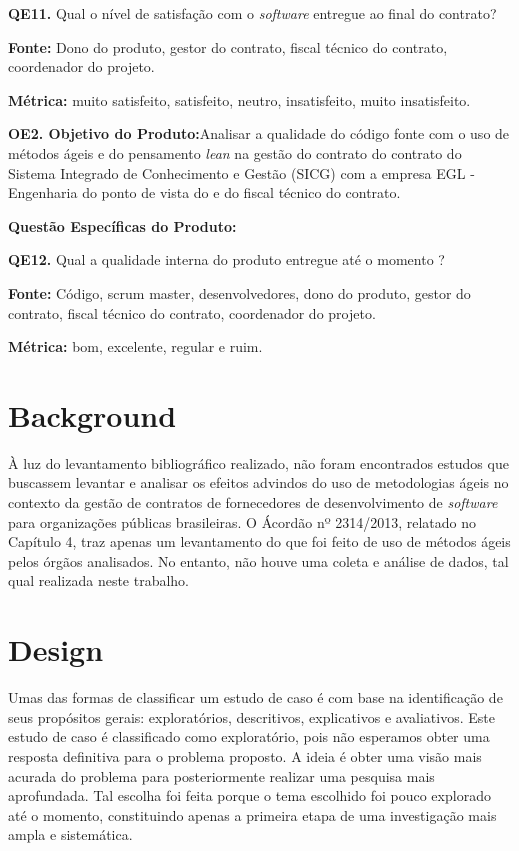  \vspace{\onelineskip} 

\textbf{QE11.} Qual o nível de satisfação com o \textit{software} entregue ao final do contrato?

\textbf{Fonte:} Dono do produto, gestor do contrato, fiscal técnico do contrato, coordenador do projeto.

\textbf{Métrica:} muito satisfeito, satisfeito, neutro, insatisfeito, muito insatisfeito.
 
 \vspace{\onelineskip} 

\textbf{OE2. Objetivo do Produto:}Analisar a qualidade do código fonte com o uso de métodos ágeis e do pensamento \textit{lean} na gestão do contrato do contrato do Sistema Integrado 
de Conhecimento e Gestão (SICG) com a empresa EGL - Engenharia do ponto de vista do  e do fiscal técnico do contrato.

\textbf{Questão Específicas do Produto:}

\textbf{QE12.} Qual a qualidade interna do produto entregue até o momento ?

\textbf{Fonte:} Código, scrum master, desenvolvedores, dono do produto, gestor do contrato, fiscal técnico do contrato, coordenador do projeto.

\textbf{Métrica:} bom, excelente, regular e ruim.


\section[Background]{Background}

À luz do levantamento bibliográfico realizado, não foram encontrados estudos que buscassem levantar e analisar os efeitos advindos do uso de metodologias ágeis no contexto da gestão de contratos de fornecedores de desenvolvimento de \textit{software} para organizações públicas brasileiras. O Ácordão nº 2314/2013, relatado no Capítulo 4, traz apenas um levantamento do que foi feito de uso de métodos ágeis pelos órgãos analisados. No entanto, não houve uma coleta e análise de dados, tal qual realizada neste trabalho.

\section[Design]{Design}

Umas das formas de classificar um estudo de caso é com base na identificação de seus propósitos gerais: exploratórios, descritivos, explicativos e avaliativos. Este estudo de caso é classificado como exploratório, pois não esperamos obter uma resposta definitiva para o problema proposto. A ideia é obter uma visão mais acurada do problema para posteriormente realizar uma pesquisa mais aprofundada. Tal escolha foi feita porque o tema escolhido foi pouco explorado até o momento, constituindo apenas a primeira etapa de uma investigação mais ampla e sistemática. 

